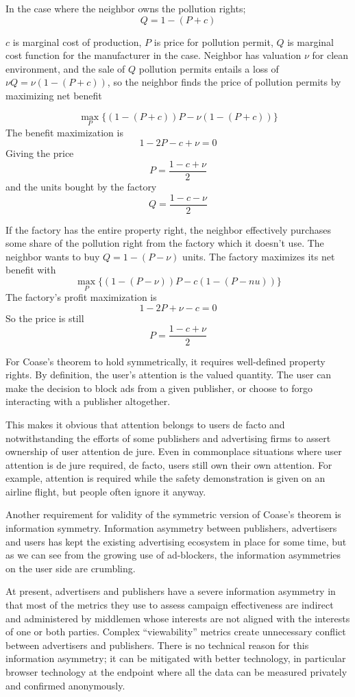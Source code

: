 \documentclass[11pt]{article}
\begin{document}
In the case where the neighbor owns the pollution rights;
  \[ Q= 1-(P + c) \]

$c$ is marginal cost of production, $P$ is price for pollution permit, $Q$ is marginal cost 
function for the manufacturer in the case. Neighbor has valuation $ \nu $ for clean environment,  and the sale of $Q$ pollution permits entails a loss of $ \nu Q = \nu(1-(P+c))$, so the neighbor finds the price of pollution permits by maximizing net benefit 

\[ \max_{P} \{ (1-(P+c))P - \nu(1-(P+c)) \} \]
The benefit maximization is \[1-2P -c + \nu = 0\]
Giving the price \[P =\frac{1-c+\nu}{2} \] and the units bought by the factory 
\[Q=\frac{1-c-\nu}{2} \]

   If the factory has the entire property right, the neighbor effectively purchases some share of the pollution right from the factory which it doesn't use. The neighbor wants to buy $Q=1-(P-\nu)$ units. The factory maximizes its net benefit with
   \[ \max_{P} \{ (1-(P-\nu))P - c(1-(P -nu)) \}  \]
   The factory's profit maximization is
   \[ 1-2P + \nu -c = 0\]
   So the price is still \[P=\frac{1-c+\nu}{2} \]

For Coase's theorem to hold symmetrically, it requires well-defined
property rights. By definition, the user's attention is the valued
quantity. The user can make the decision to block ads from a given
publisher, or choose to forgo interacting with a publisher altogether.

This makes it obvious that attention belongs to users de facto and
notwithstanding the efforts of some publishers and advertising firms
to assert ownership of user attention de jure. Even in commonplace
situations where user attention is de jure required, de facto, users
still own their own attention. For example, attention is required
while the safety demonstration is given on an airline flight, but
people often ignore it anyway.

Another requirement for validity of the symmetric version of Coase's
theorem is information symmetry. Information asymmetry between
publishers, advertisers and users has kept the existing advertising
ecosystem in place for some time, but as we can see from the growing
use of ad-blockers, the information asymmetries on the user side are
crumbling. 

At present, advertisers and publishers have a severe information
asymmetry in that most of the metrics they use to assess campaign
effectiveness are indirect and administered by middlemen whose
interests are not aligned with the interests of one or both
parties. Complex ``viewability'' metrics create unnecessary conflict
between advertisers and publishers. There is no technical reason for
this information asymmetry; it can be mitigated with better
technology, in particular browser technology at the endpoint where all
the data can be measured privately and confirmed anonymously.
\end{document}
